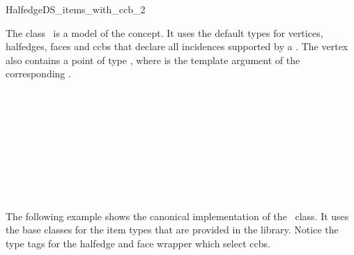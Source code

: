
\ccRefPageBegin



\begin{ccRefClass}{HalfedgeDS_items_with_ccb_2}
\label{pageHalfedgeDSitemsWithCcbRef}

\ccDefinition
  
The class \ccRefName\ is a model of the  concept.
It uses the default types for vertices, halfedges, faces and ccbs that
declare all incidences supported by a .  The vertex
also contains a point of type , where  
is the template argument of the corresponding .


\ccIsModel


\ccSeeAlso

\\
\\
\\
\\
\\
\\
\\
\\

\ccExample

The following example shows the canonical implementation of the
\ccRefName\ class. It uses the base classes for the item types that
are provided in the library.
Notice the type tags for the halfedge and face wrapper which
select ccbs.


\end{ccRefClass}
